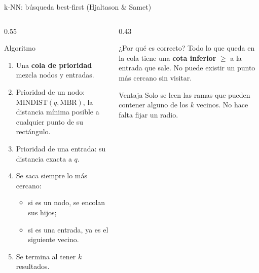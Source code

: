 \documentclass[aspectratio=169,10pt]{beamer}
\begin{document}
\begin{frame}{k-NN: búsqueda best-first (Hjaltason \& Samet)}
  \begin{columns}[T]
    \begin{column}{0.55\textwidth}
      \begin{block}{Algoritmo}
        \small
        \begin{enumerate}
          \item Una \textbf{cola de prioridad} mezcla nodos y entradas.
          \item Prioridad de un nodo: $\text{MINDIST}(q, \text{MBR})$, la distancia mínima posible a cualquier punto de su rectángulo.
          \item Prioridad de una entrada: su distancia exacta a $q$.
          \item Se saca siempre lo más cercano:
            \begin{itemize}\scriptsize
              \item si es un nodo, se encolan sus hijos;
              \item si es una entrada, \alert{ya es el siguiente vecino}.
            \end{itemize}
          \item Se termina al tener $k$ resultados.
        \end{enumerate}
      \end{block}
    \end{column}
    \begin{column}{0.43\textwidth}
      \begin{block}{¿Por qué es correcto?}
        \small Todo lo que queda en la cola tiene una \textbf{cota inferior} $\ge$ a la entrada que sale. No puede existir un punto más cercano sin visitar.
      \end{block}
      \begin{exampleblock}{Ventaja}
        \small Solo se leen las ramas que pueden contener alguno de los $k$ vecinos. No hace falta fijar un radio.
      \end{exampleblock}
    \end{column}
  \end{columns}
\end{frame}
\end{document}
